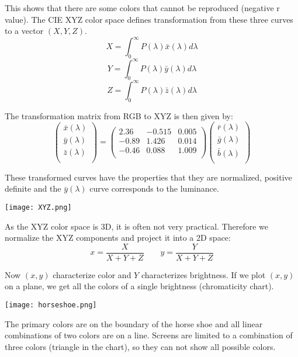 This shows that there are some colors that cannot be reproduced (negative r value). The CIE XYZ color space defines transformation from these three curves to a vector $(X, Y, Z)$. 
$$X = \int_0^\infty P(\lambda) \bar x (\lambda) d\lambda$$
$$Y = \int_0^\infty P(\lambda) \bar y (\lambda) d\lambda$$
$$Z = \int_0^\infty P(\lambda) \bar z (\lambda) d\lambda$$

The transformation matrix from RGB to XYZ is then given by:
$$\begin{pmatrix}
	\bar x(\lambda) \\
	\bar y(\lambda) \\
	\bar z(\lambda) \\
\end{pmatrix}
=
\begin{pmatrix}
	2.36 & -0.515 & 0.005 \\
	-0.89 & 1.426 & 0.014 \\
	-0.46 & 0.088 & 1.009 \\
\end{pmatrix}
\begin{pmatrix}
	\bar r(\lambda) \\
	\bar g(\lambda) \\
	\bar b(\lambda) \\
\end{pmatrix}
$$

These transformed curves have the properties that they are normalized, positive definite and the $\bar y (\lambda)$ curve corresponds to the luminance.

\begin{center}
	\texttt{[image: XYZ.png]}
\end{center}

As the XYZ color space is 3D, it is often not very practical. Therefore we normalize the XYZ components and project it into a 2D space:
$$x = \frac{X}{X + Y + Z} \qquad y = \frac{Y}{X + Y + Z}$$

Now $(x,y)$ characterize color and $Y$ characterizes brightness. If we plot $(x,y)$ on a plane, we get all the colors of a single brightness (chromaticity chart).
\begin{center}
	\texttt{[image: horseshoe.png]}
\end{center}
 
The primary colors are on the boundary of the horse shoe and all linear combinations of two colors are on a line. Screens are limited to a combination of three colors (triangle  in the chart), so they can not show all possible colors.\medskip

